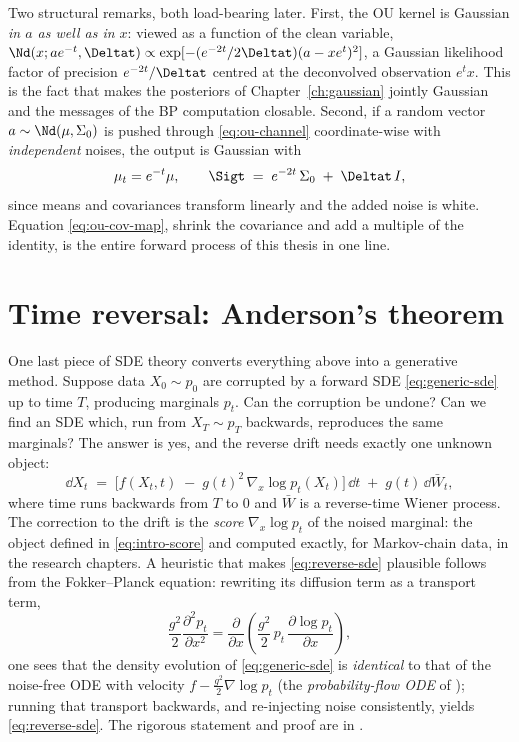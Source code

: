 Two structural remarks, both load-bearing later. First, the OU kernel is
Gaussian \emph{in $a$ as well as in $x$}: viewed as a function of the
clean variable,
$\Nd(x; a e^{-t}, \Deltat) \propto
\exp[-(e^{-2t}/2\Deltat)(a - x e^{t})^2]$, a Gaussian likelihood factor
of precision $e^{-2t}/\Deltat$ centred at the deconvolved observation
$e^t x$. This is the fact that makes the posteriors of
Chapter~\ref{ch:gaussian} jointly Gaussian and the messages of the BP
computation closable. Second, if a random vector
$a \sim \Nd(\mu, \Sigma_0)$ is pushed through \eqref{eq:ou-channel}
coordinate-wise with \emph{independent} noises, the output is Gaussian
with
\begin{equation}
  \mu_t = e^{-t}\mu,
  \qquad
  \Sigt \;=\; e^{-2t}\, \Sigma_0 \;+\; \Deltat\, I ,
  \label{eq:ou-cov-map}
\end{equation}
since means and covariances transform linearly and the added noise is
white. Equation \eqref{eq:ou-cov-map}, shrink the covariance and add a
multiple of the identity, is the entire forward process of this thesis in
one line.

\section{Time reversal: Anderson's theorem}\label{sec:reversal}

One last piece of SDE theory converts everything above into a generative
method. Suppose data $X_0 \sim p_0$ are corrupted by a forward SDE
\eqref{eq:generic-sde} up to time $T$, producing marginals $p_t$. Can the
corruption be undone? Can we find an SDE which, run from $X_T \sim p_T$
backwards, reproduces the same marginals? The answer
\citep{anderson1982reverse} is yes, and the reverse drift needs exactly
one unknown object:
\begin{equation}
  \dd X_t \;=\;
  \Big[ f(X_t, t) \;-\; g(t)^2\, \nabla_x \log p_t(X_t) \Big]\,\dd t
  \;+\; g(t)\, \dd \bar W_t ,
  \label{eq:reverse-sde}
\end{equation}
where time runs backwards from $T$ to $0$ and $\bar W$ is a reverse-time
Wiener process. The correction to the drift is the \emph{score}
$\nabla_x \log p_t$ of the noised marginal: the object defined in
\eqref{eq:intro-score} and computed exactly, for Markov-chain data, in
the research chapters. A heuristic that makes \eqref{eq:reverse-sde}
plausible follows from the Fokker--Planck equation: rewriting its
diffusion term as a transport term,
\begin{equation*}
  \frac{g^2}{2} \frac{\partial^2 p_t}{\partial x^2}
  = \frac{\partial}{\partial x}\!\left(
      \frac{g^2}{2}\, p_t\, \frac{\partial \log p_t}{\partial x}
    \right),
\end{equation*}
one sees that the density evolution of \eqref{eq:generic-sde} is
\emph{identical} to that of the noise-free ODE with velocity
$f - \tfrac{g^2}{2} \nabla \log p_t$ (the \emph{probability-flow ODE} of
\citealp{song2021scorebased}); running that transport backwards, and
re-injecting noise consistently, yields \eqref{eq:reverse-sde}. The
rigorous statement and proof are in \citet{anderson1982reverse}.

